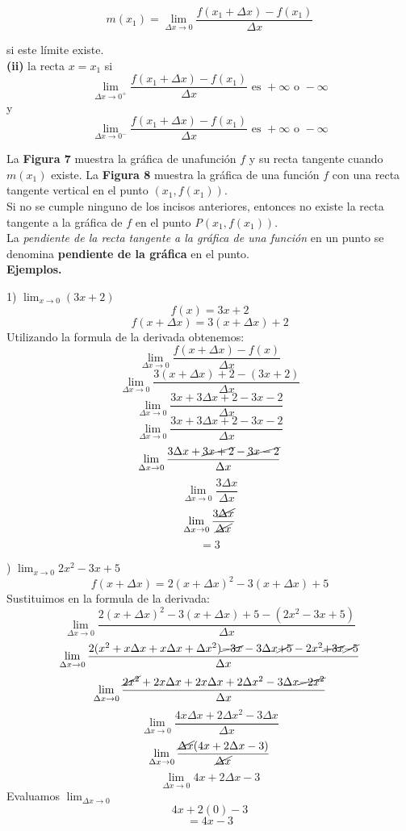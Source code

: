 \documentclass[11pt]{report}
\begin{document}
$$m(x_1)= \lim_{\Delta x \to 0} \frac{f(x_1+\Delta x)-f(x_1)}{\Delta x}$$

si este límite existe.\\[2mm]
\textbf{(ii)} la recta $x=x_1$ si
$$\lim_{\Delta x \to 0^+}\frac{f(x_1+\Delta x)-f(x_1)}{\Delta x}\text{ es }+\infty\text{ o }-\infty$$
\hspace*{30mm}y
$$\lim_{\Delta x \to 0^-}\frac{f(x_1+\Delta x)-f(x_1)}{\Delta x}\text{ es }+\infty\text{ o }-\infty$$

\hspace*{10mm}La \textbf{Figura 7} muestra la gráfica de unafunción $f$ y su recta tangente cuando $m(x_1)$ existe. La \textbf{Figura 8} muestra la gráfica de una función $f$ con una recta tangente vertical en el punto $(x_1,f(x_1))$.\\[2mm]
\hspace*{10mm}Si no se cumple ninguno de los incisos anteriores, entonces no existe la recta tangente a la gráfica de $f$ en el punto \textit{P}$(x_1,f(x_1))$.\\[2mm]
\hspace*{10mm}La \textit{pendiente de la recta tangente a la gráfica de una función} en un punto se denomina \textbf{pendiente de la gráfica} en el punto.\\[2mm]
\textbf{Ejemplos.}

1) $\lim_{x\to 0} (3x+2)$
$$f(x)=3x+2$$
$$f(x+\Delta x)=3(x+\Delta x)+2$$
Utilizando la formula de la derivada obtenemos:
$$\lim_{\Delta x \to 0}\frac{f(x+\Delta x)-f(x)}{\Delta x}$$
$$\lim_{\Delta x \to 0}\frac{3(x+\Delta x)+2-(3x+2)}{\Delta x}$$
$$\lim_{\Delta x \to 0}\frac{3x+3\Delta x+2-3x-2}{\Delta x}$$
$$\lim_{\Delta x \to 0}\frac{3x+3\Delta x+2-3x-2}{\Delta x}$$
$$\lim_{\Delta x \to 0}\frac{3\Delta x+\cancel{3x+2}-\cancel{3x-2}}{\Delta x}$$
$$\lim_{\Delta x \to 0}\frac{3\Delta x}{\Delta x}$$
$$\lim_{\Delta x \to 0}\frac{3\cancel{\Delta x}}{\cancel{\Delta x}}$$
$$=3$$

) $\lim_{x\to 0} 2x^2-3x+5$
$$f(x+\Delta x)=2(x+\Delta x)^2-3(x+\Delta x)+5$$
Sustituimos en la formula de la derivada:
$$\lim_{\Delta x \to 0}\frac{2(x+\Delta x)^2-3(x+\Delta x)+5-(2x^2-3x+5)}{\Delta x}$$
$$\lim_{\Delta x \to 0}\frac{2(x^2+x\Delta x+x\Delta x+\Delta x^2)\cancel{-3x}-3\Delta x\cancel{+5}-2x^2\cancel{+3x}\cancel{-5}}{\Delta x}$$
$$\lim_{\Delta x \to 0}\frac{\cancel{2x^2}+2x\Delta x+2x\Delta x+2\Delta x^2-3\Delta x\cancel{-2x^2}}{\Delta x}$$
$$\lim_{\Delta x \to 0}\frac{4x\Delta x+2\Delta x^2-3\Delta x}{\Delta x}$$
$$\lim_{\Delta x \to 0}\frac{\cancel{\Delta x}(4x+2\Delta x-3)}{\cancel{\Delta x}}$$
$$\lim_{\Delta x \to 0}4x+2\Delta x -3$$
Evaluamos $\lim_{\Delta x \to 0}$
$$4x+2(0)-3$$
$$=4x-3$$
\end{document}
